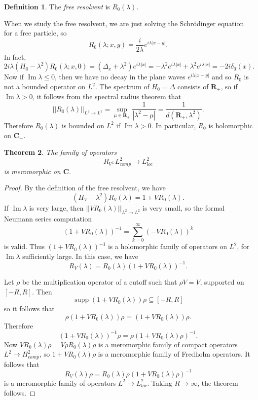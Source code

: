 \documentclass[12pt]{report}
\newcommand{\RR}{\mathbf{R}}
\newcommand{\CC}{\mathbf{C}}
\DeclareMathOperator{\supp}{supp}
\newcommand{\dfn}[1]{\emph{#1}\index{#1}}
\renewcommand{\Im}{\operatorname{Im}}
\newtheorem{theorem}{Theorem}[chapter]
\theoremstyle{definition}
\newtheorem{definition}[theorem]{Definition}
\theoremstyle{remark}
\begin{document}
\begin{definition}
The \dfn{free resolvent} is $R_0(\lambda)$.
\end{definition}
When we study the free resolvent, we are just solving the Schrödinger equation for a free particle, so
$$R_0(\lambda; x, y) = \frac{i}{2\lambda} e^{i\lambda|x - y|}.$$
In fact,
$$2i\lambda (H_0 - \lambda^2)R_0(\lambda; x, 0) = (\Delta_x + \lambda^2) e^{i\lambda|x|} = -\lambda^2 e^{i\lambda|x|} + \lambda^2 e^{i\lambda|x|} = -2i\delta_0(x).$$
Now if $\Im \lambda \leq 0$, then we have no decay in the plane waves $e^{i\lambda|x - y|}$ and so $R_0$ is not a bounded operator on $L^2$. The spectrum of $H_0 = \Delta$ consists of $\RR_+$, so if $\Im \lambda > 0$, it follows from the spectral radius theorem that
$$||R_0(\lambda)||_{L^2 \to L^2} = \sup_{\mu \in \RR_+} \frac{1}{|\lambda^2 - \mu|} = \frac{1}{d(\RR_+, \lambda^2)}.$$
Therefore $R_0(\lambda)$ is bounded on $L^2$ if $\Im \lambda > 0$. In particular, $R_0$ is holomorphic on $\CC_+$.

\begin{theorem}
The family of operators
$$R_V: L^2_{comp} \to L^2_{loc}$$
is meromorphic on $\CC$.
\end{theorem}
\begin{proof}
By the definition of the free resolvent, we have
$$(H_V - \lambda^2)R_V(\lambda) = 1 + VR_0(\lambda).$$
If $\Im \lambda$ is very large, then $||VR_0(\lambda)||_{L^2 \to L^2}$ is very small, so the formal Neumann series computation
$$(1 + VR_0(\lambda))^{-1} = \sum_{k=0}^\infty (-VR_0(\lambda))^k$$
is valid. Thus $(1 + VR_0(\lambda))^{-1}$ is a holomorphic family of operators on $L^2$, for $\Im \lambda$ sufficiently large. In this case, we have
$$R_V(\lambda) = R_0(\lambda)(1 + VR_0(\lambda))^{-1}.$$

Let $\rho$ be the multiplication operator of a cutoff such that $\rho V = V$, supported on $[-R, R]$. Then
$$\supp (1 + VR_0(\lambda))\rho \subseteq [-R, R]$$
so it follows that
$$\rho(1 + VR_0(\lambda))\rho = (1 + VR_0(\lambda))\rho.$$
Therefore
$$(1 + VR_0(\lambda))^{-1}\rho = \rho(1 + VR_0(\lambda)\rho)^{-1}.$$
Now $VR_0(\lambda)\rho = V\rho R_0(\lambda)\rho$ is a meromorphic family of compact operators $L^2 \to H^2_{comp}$, so $1 + VR_0(\lambda)\rho$ is a meromorphic family of Fredholm operators. It follows that
$$R_V(\lambda)\rho = R_0(\lambda)\rho(1 + VR_0(\lambda)\rho)^{-1}$$ is a meromorphic family of operators $L^2 \to L^2_{loc}$. Taking $R \to \infty$, the theorem follows.
\end{proof}
\end{document}
